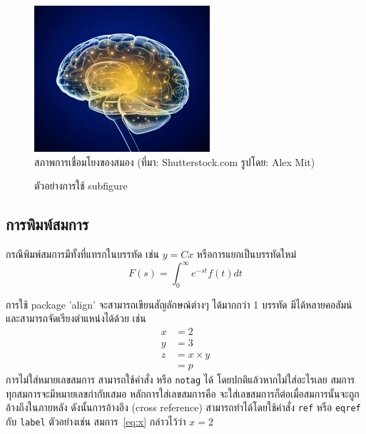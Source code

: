 \documentclass[11pt,a4paper]{article}
\begin{document}
\begin{figure}[h!]
	\begin{center}
		\includegraphics[width=0.5\linewidth]{brain.jpg}
		\caption{สภาพการเชื่อมโยงของสมอง (ที่มา: Shutterstock.com รูปโดย: Alex Mit)}
	\end{center}
\end{figure}

\begin{figure}
\centering
{} 
\caption{ตัวอย่างการใช้ subfigure}
\end{figure}

\subsection{การพิมพ์สมการ}
กรณีพิมพ์สมการมีทั้งที่แทรกในบรรทัด เช่น $y=Cx$ หรือการแยกเป็นบรรทัดใหม่
\begin{equation}
	F(s) = \int_0^\infty e^{-st} f(t) dt
\end{equation}

การใช้ package 'align' จะสามารถเขียนสัญลักษณ์ต่างๆ ได้มากกว่า 1 บรรทัด มีได้หลายคอลัมน์ และสามารถจัดเรียงตำแหน่งได้ด้วย เช่น
\begin{align}
    x    &= 2 \label{eq:x} \\
    y    &= 3 \label{eq:y} \\
    z    &= x \times y \nonumber \\
        &= p \label{eq:results}
\end{align}
การไม่ใส่หมายเลขสมการ สามารถใช้คำสั่ง \texttt{\nonumber} หรือ \texttt{notag} ได้ โดยปกติแล้วหากไม่ใส่อะไรเลย สมการทุกสมการจะมีหมายเลขกำกับเสมอ หลักการใส่เลขสมการคือ จะใส่เลขสมการก็ต่อเมื่อสมการนั้นจะถูกอ้างถึงในภายหลัง ดังนั้นการอ้างอึง (cross reference) สามารถทำได้โดยใช้คำสั่ง \texttt{ref} หรือ \texttt{eqref} กับ \texttt{label} ตัวอย่างเช่น สมการ~\eqref{eq:x} กล่าวไว้ว่า $x=2$
\end{document}
